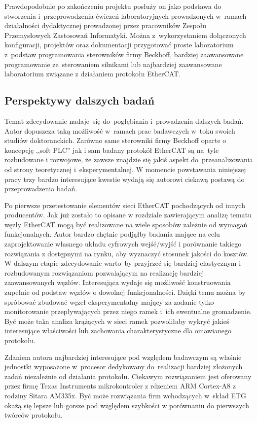Prawdopodobnie po zakończeniu projektu posłuży on jako podstawa do stworzenia i~przeprowadzenia ćwiczeń laboratoryjnych prowadzonych w~ramach działalności dydaktycznej prowadzonej przez pracowników Zespołu Przemysłowych Zastosowań Informatyki. Można z~wykorzystaniem dołączonych konfiguracji, projektów oraz dokumentacji przygotować proste laboratorium z~podstaw programowania sterowników firmy Beckhoff, bardziej zaawansowane programowanie ze~sterowaniem silnikami lub najbardziej zaawansowane laboratorium związane z działaniem protokołu EtherCAT.

\subsection{Perspektywy dalszych badań}
Temat zdecydowanie nadaje~się do~pogłębiania i~prowadzenia dalszych badań. Autor dopuszcza taką możliwość w~ramach prac badawczych w~toku swoich studiów doktoranckich. Zarówno same sterowniki firmy Beckhoff oparte o koncepcję ,,soft PLC'' jak i sam badany protokół EtherCAT są na~tyle rozbudowane i rozwojowe, że zawsze znajdzie się jakiś aspekt do~przeanalizowania od strony teoretycznej i~eksperymentalnej. W momencie powstawania niniejszej pracy trzy bardzo interesujące kwestie wydają się autorowi ciekawą postawą do przeprowadzenia badań.

Po pierwsze przetestowanie elementów sieci EtherCAT pochodzących od innych producentów. 
Jak już zostało to opisane w rozdziale zawierającym analizę tematu węzły EtherCAT mogą być realizowane na wiele sposobów zależnie od wymagań funkcjonalnych. Autor bardzo chętnie podjąłby badania mające na celu zaprojektowanie własnego układu cyfrowych wejść/wyjść i porównanie takiego rozwiązania z dostępnymi na rynku, aby wyznaczyć stosunek jakości do kosztów. W dalszym etapie zdecydowanie warto~by przyjrzeć się bardziej elastycznym i rozbudowanym rozwiązaniom pozwalającym na realizację bardziej zaawansowanych węzłów.
Interesująca wydaje się możliwość konstruowania zupełnie od podstaw węzłów o dowolnej funkcjonalności. Dzięki temu można by spróbować zbudować węzeł eksperymentalny mający za zadanie tylko monitorowanie przepływających przez niego ramek i~ich ewentualne gromadzenie. Być może taka analiza krążących w sieci ramek pozwoliłaby wykryć jakieś interesujące właściwości lub zachowania charakterystyczne dla omawianego protokołu.

Zdaniem autora najbardziej interesujące pod względem badawczym są właśnie jednostki wyposażone w~procesor dedykowany do~realizacji bardziej złożonych zadań niezależnie od działania protokołu. Ciekawym rozwiązaniem jest oferowany przez firmę Texas Instruments mikrokontroler z rdzeniem ARM Cortex-A8 z rodziny Sitara AM335x. Być może rozwiązania firm wchodzących w~skład ETG okażą się lepsze lub gorsze pod względem szybkości w porównaniu do pierwszych twórców protokołu.

